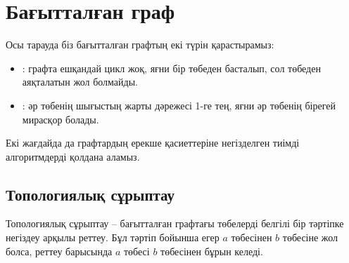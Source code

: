 \chapter{Бағытталған граф}

Осы тарауда біз бағытталған графтың екі түрін қарастырамыз:
\begin{itemize}
\item {}:
графта ешқандай цикл жоқ, яғни бір төбеден басталып, 
сол төбеден аяқталатын жол болмайды.
\item {}:
әр төбенің шығыстың жарты дәрежесі 1-ге тең, 
яғни әр төбенің бірегей мирасқор болады.
\end{itemize}
Екі жағдайда да графтардың ерекше 
қасиеттеріне негізделген тиімді алгоритмдерді
қолдана аламыз.

\section{Топологиялық сұрыптау}


Топологиялық сұрыптау -- бағытталған графтағы төбелерді
белгілі бір тәртіпке негіздеу арқылы реттеу. Бұл тәртіп бойынша
егер $a$ төбесінен $b$ төбесіне жол болса, реттеу барысында 
$a$ төбесі $b$ төбесінен бұрын келеді.


